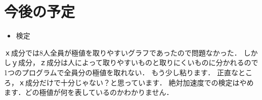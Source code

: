 \section{今後の予定}
    \begin{itemize}
        \item 検定
    \end{itemize}

    ｘ成分では8人全員が極値を取りやすいグラフであったので問題なかった．
    しかしｙ成分，ｚ成分は人によって取りやすいものと取りにくいものに分かれるので
    1つのプログラムで全員分の極値を取れない．
    もう少し粘ります．
    正直なところ，ｘ成分だけで十分じゃない？と思っています．
    絶対加速度での検定はやめます．どの極値が何を表しているのかわかりません．




